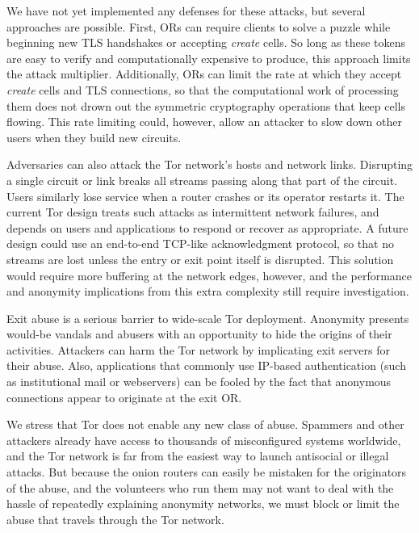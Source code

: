 \documentclass[times,10pt,twocolumn]{article}
\begin{document}
We have not yet implemented any defenses for these attacks, but several
approaches are possible. First, ORs can
require clients to solve a puzzle \cite{puzzles-tls} while beginning new
TLS handshakes or accepting \emph{create} cells.  So long as these
tokens are easy to verify and computationally expensive to produce, this
approach limits the attack multiplier.  Additionally, ORs can limit
the rate at which they accept \emph{create} cells and TLS connections,
so that
the computational work of processing them does not drown out the
symmetric cryptography operations that keep cells
flowing.  This rate limiting could, however, allow an attacker
to slow down other users when they build new circuits.


Adversaries can also attack the Tor network's hosts and network
links. Disrupting a single circuit or link breaks all streams passing
along that part of the circuit. Users similarly lose service
when a router crashes or its operator restarts it. The current
Tor design treats such attacks as intermittent network failures, and
depends on users and applications to respond or recover as appropriate. A
future design could use an end-to-end TCP-like acknowledgment protocol,
so that no streams are lost unless the entry or exit point itself is
disrupted. This solution would require more buffering at the network
edges, however, and the performance and anonymity implications from this
extra complexity still require investigation.

\label{subsec:exitpolicies}


Exit abuse is a serious barrier to wide-scale Tor deployment. Anonymity
presents would-be vandals and abusers with an opportunity to hide
the origins of their activities. Attackers can harm the Tor network by
implicating exit servers for their abuse. Also, applications that commonly
use IP-based authentication (such as institutional mail or webservers)
can be fooled by the fact that anonymous connections appear to originate
at the exit OR.

We stress that Tor does not enable any new class of abuse. Spammers
and other attackers already have access to thousands of misconfigured
systems worldwide, and the Tor network is far from the easiest way
to launch antisocial or illegal attacks.
But because the
onion routers can easily be mistaken for the originators of the abuse,
and the volunteers who run them may not want to deal with the hassle of
repeatedly explaining anonymity networks, we must block or limit
the abuse that travels through the Tor network.
\end{document}
